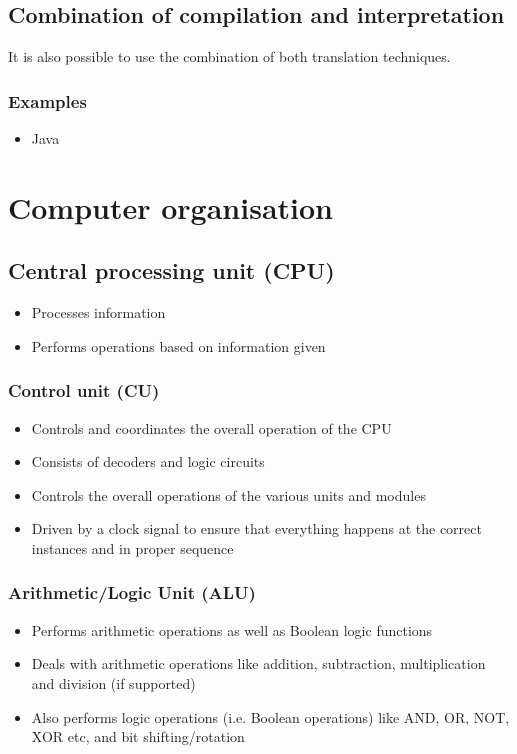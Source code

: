 \documentclass[11pt]{article}
\begin{document}
\subsection{Combination of compilation and interpretation}
\label{sec:org8cfdad6}
It is also possible to use the combination of both translation techniques.
\subsubsection{Examples}
\label{sec:org876c76f}
\begin{itemize}
\item Java
\end{itemize}
\section{Computer organisation}
\label{sec:org58c2393}

\subsection{Central processing unit (CPU)}
\label{sec:org669eaa1}
\begin{itemize}
\item Processes information
\item Performs operations based on information given
\end{itemize}
\subsubsection{Control unit (CU)}
\label{sec:orgeb2d67f}
\begin{itemize}
\item Controls and coordinates the overall operation of the CPU
\item Consists of decoders and logic circuits
\item Controls the overall operations of the various units and modules
\item Driven by a clock signal to ensure that everything happens at the correct instances and in proper sequence
\end{itemize}
\subsubsection{Arithmetic/Logic Unit (ALU)}
\label{sec:orgdef3028}
\begin{itemize}
\item Performs arithmetic operations as well as Boolean logic functions
\item Deals with arithmetic operations like addition, subtraction, multiplication and division (if supported)
\item Also performs logic operations (i.e. Boolean operations) like AND, OR, NOT, XOR etc, and bit shifting/rotation
\end{itemize}
\end{document}
